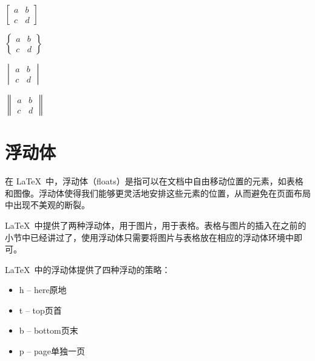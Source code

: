 {{{\begin{texlst}
\begin{math}
\begin{bmatrix}
	a & b \\
	c & d
\end{bmatrix}
\end{math}
\end{texlst}

\begin{texlst}
\begin{math}
\begin{Bmatrix}
	a & b \\
	c & d
\end{Bmatrix}
\end{math}
\end{texlst}

\begin{texlst}
\begin{math}
\begin{vmatrix}
	a & b \\
	c & d
\end{vmatrix}
\end{math}
\end{texlst}

\begin{texlst}
\begin{math}
\begin{Vmatrix}
	a & b \\
	c & d
\end{Vmatrix}
\end{math}
\end{texlst}

\section{浮动体}
在 \LaTeX\ 中，浮动体（floats）是指可以在文档中自由移动位置的元素，如表格和图像。浮动体使得我们能够更灵活地安排这些元素的位置，从而避免在页面布局中出现不美观的断裂。

\LaTeX\ 中提供了两种浮动体，用于图片，用于表格。表格与图片的插入在之前的小节中已经讲过了，使用浮动体只需要将图片与表格放在相应的浮动体环境中即可。

\LaTeX\  中的浮动体提供了四种浮动的策略：
\begin{itemize}
	\item h -- here原地
	\item t -- top页首
	\item b -- bottom页末
	\item p -- page单独一页
\end{itemize}

}}}
